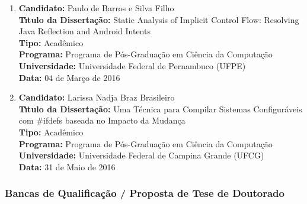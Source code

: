 \documentclass[a4paper,oneside,10pt]{article}
\begin{document}
\begin{enumerate}
\item       \textbf{Candidato:} Paulo de Barros e Silva Filho \mbox{} \\
            \textbf{T\'{\i}tulo da Disserta\c{c}\~{a}o:} Static Analysis of Implicit Control Flow: Resolving Java Reflection and Android Intents\\
            \textbf{Tipo:} Acadêmico\\
            \textbf{Programa:} Programa de Pós-Graduação em Ciência da Computação\\
            \textbf{Universidade:} Universidade Federal de Pernambuco (UFPE)\\
            \textbf{Data:} 04 de Março de 2016

\item       \textbf{Candidato:} Larissa Nadja Braz Brasileiro \mbox{} \\
            \textbf{T\'{\i}tulo da Disserta\c{c}\~{a}o:} Uma Técnica para Compilar Sistemas Configuráveis com \#ifdefs baseada no Impacto da Mudança\\
            \textbf{Tipo:} Acadêmico\\
            \textbf{Programa:} Programa de Pós-Graduação em Ciência da Computação\\
            \textbf{Universidade:} Universidade Federal de Campina Grande (UFCG)\\
            \textbf{Data:} 31 de Maio de 2016



\end{enumerate}


\subsubsection{Bancas de Qualifica\c{c}\~ao / Proposta de Tese de Doutorado}
\vspace{0.3cm}
\end{document}
